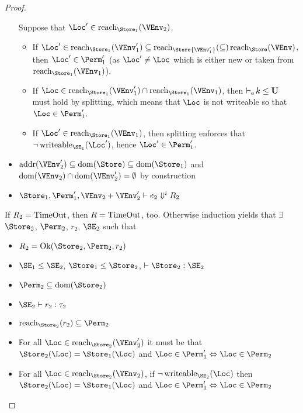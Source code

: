\begin{proof}
\begin{itemize}
    Suppose that $\Loc' \in \Reach{\Store_1}{\VEnv_2}$.
    \begin{itemize}
    \item If $\Loc' \in \Reach{\Store_1}{\VEnv_1'} \subseteq
      \Reach\Store{\VEnv_1'} \subseteq \Reach\Store\VEnv$, then $\Loc'
      \in \Perm_1'$ (as $\Loc' \ne \Loc$ which is either new or taken
      from $\Reach{\Store_1}{\VEnv_1}$).
    \item If
      $\Loc \in \Reach{\Store_1}{\VEnv_1'} \cap
      \Reach{\Store_1}{\VEnv_1}$, then ${\operatorname{\vdash_e} k \le \mathbf{U}}$
      must hold by splitting, which means that $\Loc$ is not writeable
      so that $\Loc\in\Perm_1'$.
    \item If $\Loc' \in \Reach{\Store_1}{\VEnv_1}$, then splitting
      enforces that $\neg\Writeable{\SE_1}{\Loc'}$, hence $\Loc' \in \Perm_1'$.
    \end{itemize}
  \item $\Addresses{\VEnv_2'} \subseteq \Dom{\Store} \subseteq \Dom{\Store_1}$ and
    $\Dom{\VEnv_2} \cap \Dom{\VEnv_2'}=\emptyset$ by construction
  \item $\Store_1, \Perm_1', \VEnv_2 + \VEnv_2' \vdash {e_2}
    \Downarrow^i R_2$
  \end{itemize}
  If $R_2 = \operatorname{TimeOut}$, then $R = \operatorname{TimeOut}$, too.
  Otherwise induction yields that
  $\exists$ $\Store_2$, $\Perm_2$, $r_2$, $\SE_2$ such that
  \begin{itemize}
  \item
    $R_2 = \Ok{\Store_2, \Perm_2, r_2}$  
  \item $\SE_1 \le \SE_2$, $\Store_1 \le \Store_2$,
    $\vdash \Store_2 : \SE_2$ 
  \item $\Perm_2 \subseteq \Dom{\Store_2}$
  \item $\SE_2 \vdash r_2 : \tau_2$
  \item $\Reach{\Store_2}{r_2} \subseteq \Perm_2$
  \item For all $\Loc \in \Reach{\Store_2}{\VEnv_2'}$ it must be that
    $\Store_2 (\Loc) = \Store_1 (\Loc)$
    and $\Loc\in\Perm_1' \Leftrightarrow \Loc\in\Perm_2$ 
  \item For all $\Loc \in \Reach{\Store_2}{\VEnv_2}$,
    if $\neg \Writeable{\SE_2}\Loc $ then
    $\Store_2 (\Loc) = \Store_1 (\Loc)$
    and $\Loc\in\Perm_1' \Leftrightarrow \Loc\in\Perm_2$ 
  \end{itemize}


\end{proof}

